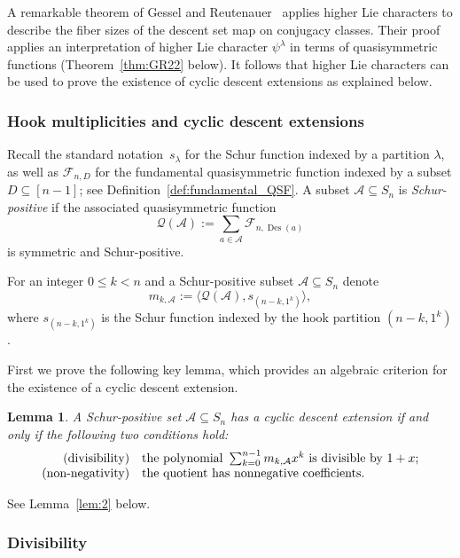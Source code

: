 \documentclass[10pt]{article}
\newtheorem{lemma}[theorem]{Lemma}
\theoremstyle{definition}
\newcommand{\Q}{\mathcal Q}
\newcommand{\f}{\mathcal F}
\newcommand{\A}{\mathcal A}
\DeclareMathOperator\Des{Des}
\begin{document}
A remarkable theorem of  Gessel and Reutenauer~\cite[Theorem 2.1]{GR} 
applies higher Lie characters to describe the fiber sizes of the descent set map on conjugacy classes.  
Their proof applies an interpretation of higher Lie character $\psi^\lambda$ in terms of quasisymmetric functions 
(Theorem~\ref{thm:GR22} below). 
It follows that 
higher Lie characters can be used to prove the existence of cyclic descent extensions 
as explained below. 


\subsubsection{Hook multiplicities and cyclic descent extensions} 

Recall the standard notation~$s_\lambda$ for the Schur function indexed by a partition $\lambda$, 
as well as $\f_{n,D}$ for the fundamental quasisymmetric function indexed by a subset $D\subseteq [n-1]$;
see Definition~\ref{def:fundamental_QSF}.
A subset $\A\subseteq S_n$ is {\em Schur-positive} 
if the
associated quasisymmetric function
\[
\Q(\A):=\sum\limits_{a\in \A}\f_{n,\Des(a)}
\]
is symmetric and Schur-positive.

For an integer $0 \le k<n$ and a Schur-positive subset $\A \subseteq S_n$ denote
\[
m_{k,\A} := \langle \Q(\A), s_{(n-k,1^k)} \rangle,
\]
where $s_{(n-k,1^k)}$ is the Schur function indexed by the hook partition $(n-k,1^k)$.

First we prove the following key lemma, which provides an algebraic criterion for the existence of a cyclic descent extension. 

\begin{lemma}\label{lem:21}
A Schur-positive set $\A\subseteq S_n$ has a cyclic descent extension if and only if 
the following two conditions hold:
\[
\begin{array}{rl}
	\text{\rm (divisibility)}   & 
	\text{the polynomial }
	\sum_{k=0}^{n-1} m_{k,\A} x^k
	\text{ is divisible by } 1+x; \\
	\text{\rm (non-negativity)} & 
	\text{the quotient has nonnegative coefficients.}
\end{array}
\]
\end{lemma}		

See Lemma~\ref{lem:2}  below.


\subsubsection{Divisibility} 
\end{document}
